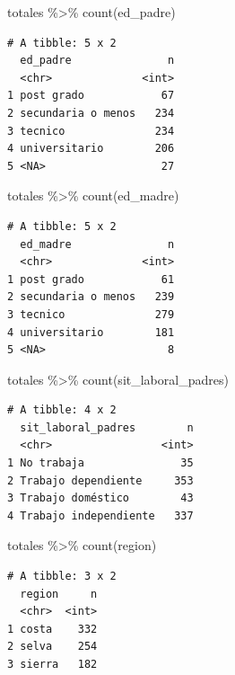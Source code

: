\documentclass[
  letterpaper,
  DIV=11,
  numbers=noendperiod]{scrartcl}
\newenvironment{Shaded}{\begin{snugshade}}{\end{snugshade}}
\newcommand{\FunctionTok}[1]{\textcolor[rgb]{0.28,0.35,0.67}{#1}}
\newcommand{\NormalTok}[1]{\textcolor[rgb]{0.00,0.23,0.31}{#1}}
\newcommand{\SpecialCharTok}[1]{\textcolor[rgb]{0.37,0.37,0.37}{#1}}
\begin{document}
\begin{Shaded}
\begin{Highlighting}[]
\NormalTok{totales }\SpecialCharTok{\%\textgreater{}\%} \FunctionTok{count}\NormalTok{(ed\_padre)}
\end{Highlighting}
\end{Shaded}

\begin{verbatim}
# A tibble: 5 x 2
  ed_padre               n
  <chr>              <int>
1 post grado            67
2 secundaria o menos   234
3 tecnico              234
4 universitario        206
5 <NA>                  27
\end{verbatim}

\begin{Shaded}
\begin{Highlighting}[]
\NormalTok{totales }\SpecialCharTok{\%\textgreater{}\%} \FunctionTok{count}\NormalTok{(ed\_madre)}
\end{Highlighting}
\end{Shaded}

\begin{verbatim}
# A tibble: 5 x 2
  ed_madre               n
  <chr>              <int>
1 post grado            61
2 secundaria o menos   239
3 tecnico              279
4 universitario        181
5 <NA>                   8
\end{verbatim}

\begin{Shaded}
\begin{Highlighting}[]
\NormalTok{totales }\SpecialCharTok{\%\textgreater{}\%} \FunctionTok{count}\NormalTok{(sit\_laboral\_padres)}
\end{Highlighting}
\end{Shaded}

\begin{verbatim}
# A tibble: 4 x 2
  sit_laboral_padres        n
  <chr>                 <int>
1 No trabaja               35
2 Trabajo dependiente     353
3 Trabajo doméstico        43
4 Trabajo independiente   337
\end{verbatim}

\begin{Shaded}
\begin{Highlighting}[]
\NormalTok{totales }\SpecialCharTok{\%\textgreater{}\%} \FunctionTok{count}\NormalTok{(region)}
\end{Highlighting}
\end{Shaded}

\begin{verbatim}
# A tibble: 3 x 2
  region     n
  <chr>  <int>
1 costa    332
2 selva    254
3 sierra   182
\end{verbatim}
\end{document}
